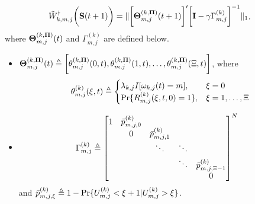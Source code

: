 \begin{lemma}
    \label{lemma:w_ap}
    \begin{align}
        &\tilde{W}^{\dagger}_{k,m,j}\bigg(\mathbf{S}(t+1)\bigg) =
        \lVert
            \bigg[
                \boldsymbol{\Theta}^{(k, \boldsymbol{\Pi})}_{m,j}(t+1)
            \bigg]'
            \bigg[
                \mathbf{I} - \gamma \Gamma^{(k)}_{m,j}
            \bigg]^{-1}
        \|_1,
        \label{w_ap}
    \end{align}
    where $\boldsymbol{\Theta}^{(k, \boldsymbol{\Pi})}_{m,j}(t)$ and $\Gamma^{(k)}_{m,j}$ are defined below.
    \begin{itemize}
        \item $\boldsymbol{\Theta}^{(k,\boldsymbol{\Pi})}_{m,j}(t) \triangleq \bigg[
            \theta^{(k,\boldsymbol{\Pi})}_{m,j}(0,t),
            \theta^{(k,\boldsymbol{\Pi})}_{m,j}(1,t),
            \dots,
            \theta^{(k,\boldsymbol{\Pi})}_{m,j}(\Xi,t)
            \bigg]$,
        where 
        \begin{align}
            \theta^{(k)}_{m,j}(\xi,t) \triangleq 
            \begin{cases}
                \lambda_{k,j} I[\omega_{k,j}(t)=m], & \xi=0
                \\
                \Pr\{R^{(k)}_{m,j}(\xi,t,0) = 1\}, & \xi=1,\dots,\Xi
            \end{cases}
        \end{align}
        \item
        \begin{align}
            \Gamma^{(k)}_{m,j} &\triangleq
            \begin{bmatrix}
                1 & \bar{p}^{(k)}_{m,j,0} &                       &        &                           \\
                  & 0                     & \bar{p}^{(k)}_{m,j,1} &        &                           \\
                  &                       & \ddots                & \ddots &                           \\
                  &                       &                       & \ddots & \bar{p}^{(k)}_{m,j,\Xi-1} \\
                  &                       &                       &        & 0                         \\
            \end{bmatrix}^{N}
        \end{align}
        and $\bar{p}^{(k)}_{m,j,\xi} \triangleq 1 - \Pr\{U^{(k)}_{m,j} < \xi+1 | U^{(k)}_{m,j}>\xi\}$.
    \end{itemize}
\end{lemma}
